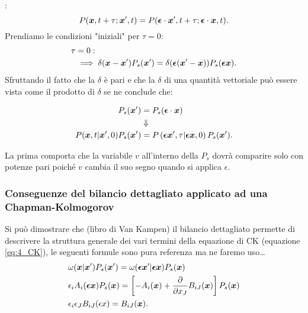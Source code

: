 :
\[
    P(\boldsymbol{x}, t+\tau ; \boldsymbol{x}', t) = 
    P(\boldsymbol{\epsilon}\cdot \boldsymbol{x}', t+\tau ; \boldsymbol{\epsilon}\cdot \boldsymbol{x}, t) 
.\] 
Prendiamo le condizioni "iniziali" per $\tau=0$:
\[\begin{aligned}
    \tau & = 0 :\\
	     &\implies  \delta (\boldsymbol{x}-\boldsymbol{x}') P_s(\boldsymbol{x}') = \delta (\boldsymbol{\epsilon} (\boldsymbol{x}'-\boldsymbol{x})) P_s(\boldsymbol{\epsilon}\boldsymbol{x}) 
.\end{aligned}\]
Sfruttando il fatto che la $\delta$ è pari e che la $\delta$ di una quantità vettoriale può essere vista come il prodotto di $\delta$ se ne conclude che:
\begin{redbox}{}
    \[\begin{aligned}
	P_s(\boldsymbol{x}') &= P_s(\boldsymbol{\epsilon}\cdot \boldsymbol{x}) \\
		       & \Downarrow\\
	P(\boldsymbol{x},t|\boldsymbol{x}', 0) P_s(\boldsymbol{x}') &=
        P\left(\boldsymbol{\epsilon}\boldsymbol{x}',\tau|\boldsymbol{\epsilon}\boldsymbol{x},0\right)P_s(\boldsymbol{x}') 
    .\end{aligned}\]
\end{redbox}
\noindent
La prima comporta che la variabile $v$ all'interno della $P_s$ dovrà comparire solo con potenze pari poiché $v$ cambia il suo segno quando si applica $\epsilon$.
\subsubsection{Conseguenze del bilancio dettagliato applicato ad una Chapman-Kolmogorov}%
\label{subsub:Conseguenze del bilancio dettagliato applicato ad una Chapman-Kolmogorov}
Si può dimostrare che (libro di Van Kampen) il bilancio dettagliato permette di descrivere la struttura generale dei vari termini della equazione di CK (equazione \ref{eq:4_CK}), le seguenti formule sono pura referenza ma ne faremo uso\ldots
\begin{equation} 
\begin{aligned}
    &\omega (\boldsymbol{x}|\boldsymbol{x}') P_s(\boldsymbol{x}') = \omega (\boldsymbol{\epsilon} \boldsymbol{x}'|\boldsymbol{\epsilon} \boldsymbol{x}) P_s(\boldsymbol{x}) \\
    &\epsilon_i A_i(\boldsymbol{\epsilon}\boldsymbol{x}) P_s(\boldsymbol{x}) =\left[-A_i(\boldsymbol{x}) + \frac{\partial }{\partial x_J} B_{iJ}(\boldsymbol{x})\right]P_s(\boldsymbol{x}) \\
    & \epsilon_i \epsilon_J B_{iJ}(\epsilon x) = B_{iJ}(\boldsymbol{x}) 
    \label{eq:11_ref}
.\end{aligned}\end{equation}
